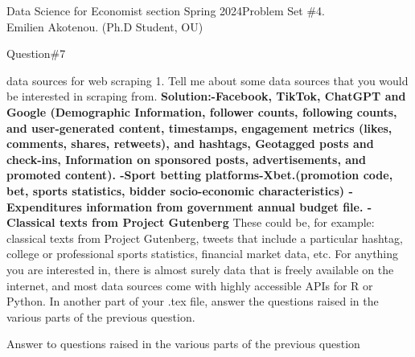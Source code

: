 \documentclass[12pt]{article}
\begin{document}
\noindent Data Science for Economist section Spring 2024\hfill Problem Set \#4.\\
Emilien Akotenou. (Ph.D Student, OU)

\hrulefill


\begin{section}{Question\#7}
\begin{subsection}{data sources for web scraping}
1. Tell me about some data sources that you would be interested in scraping from.
\newline \textbf{Solution:\newline -Facebook, TikTok, ChatGPT and Google (Demographic Information, follower counts, following counts, and user-generated content, timestamps, engagement metrics (likes, comments, shares, retweets), and hashtags, Geotagged posts and check-ins, Information on sponsored posts, advertisements, and promoted content).
\newline -Sport betting platforms-Xbet.(promotion code, bet, sports statistics, bidder socio-economic characteristics)
\newline -Expenditures information from government annual budget file. 
\newline -Classical texts from Project Gutenberg} \newline \newline
These could be, for example: classical texts from Project Gutenberg, tweets that include a particular hashtag, college or professional sports statistics, financial market
data, etc. For anything you are interested in, there is almost surely data that is freely available on the internet, and most data sources come with highly accessible APIs for R or Python.
In another part of your .tex file, answer the questions raised in the various parts of the previous question.
\end{subsection}
\begin{subsection}{Answer to questions raised in the various parts of the previous question}

\end{subsection}



\end{section}


 
\end{document}
